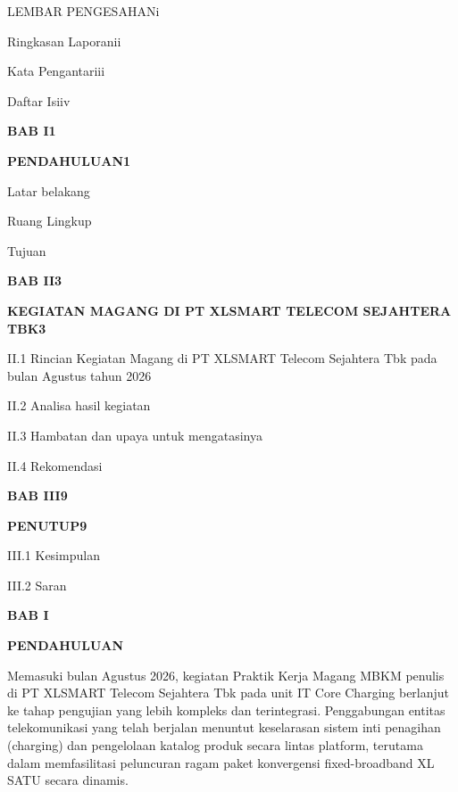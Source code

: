 \documentclass[12pt,a4paper]{article}
\begin{document}
\noindent LEMBAR PENGESAHAN\dotfill i\par
\noindent Ringkasan Laporan\dotfill ii\par
\noindent Kata Pengantar\dotfill iii\par
\noindent Daftar Isi\dotfill iv\par
\noindent\textbf{BAB I}\dotfill \textbf{1}\par
\noindent\textbf{PENDAHULUAN}\dotfill \textbf{1}\par
{} Latar belakang\par
{} Ruang Lingkup\par
{} Tujuan\par
\noindent\textbf{BAB II}\dotfill \textbf{3}\par
\noindent\textbf{KEGIATAN MAGANG DI PT XLSMART TELECOM SEJAHTERA TBK}\dotfill \textbf{3}\par
\noindent II.1 Rincian Kegiatan Magang di PT XLSMART Telecom Sejahtera Tbk pada bulan Agustus tahun 2026\par
\noindent II.2 Analisa hasil kegiatan\par
\noindent II.3 Hambatan dan upaya untuk mengatasinya\par
\noindent II.4 Rekomendasi\par
\noindent\textbf{BAB III}\dotfill \textbf{9}\par
\noindent\textbf{PENUTUP}\dotfill \textbf{9}\par
\noindent III.1 Kesimpulan\par
\noindent III.2 Saran\par

\clearpage
{}
\setcounter{page}{1}

\begin{center}
    {\bfseries\large BAB I\par}
    {\bfseries\large PENDAHULUAN\par}
\end{center}
\vspace{0.3cm}

Memasuki bulan Agustus 2026, kegiatan Praktik Kerja Magang MBKM penulis di PT XLSMART Telecom Sejahtera Tbk pada unit IT Core Charging berlanjut ke tahap pengujian yang lebih kompleks dan terintegrasi. Penggabungan entitas telekomunikasi yang telah berjalan menuntut keselarasan sistem inti penagihan (charging) dan pengelolaan katalog produk secara lintas platform, terutama dalam memfasilitasi peluncuran ragam paket konvergensi fixed-broadband XL SATU secara dinamis.
\end{document}

